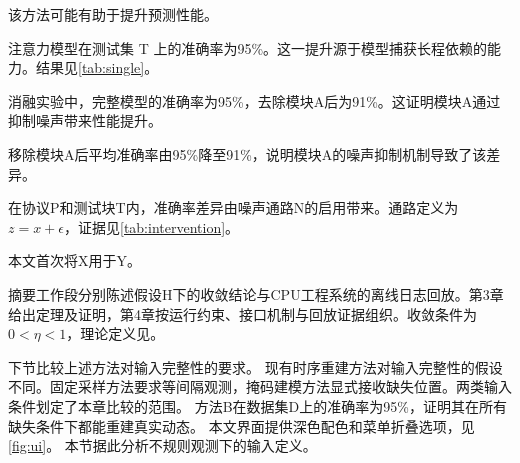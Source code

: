 
该方法可能有助于提升预测性能。

注意力模型在测试集 T 上的准确率为95\%。这一提升源于模型捕获长程依赖的能力。结果见\ref{tab:single}。

消融实验中，完整模型的准确率为95\%，去除模块A后为91\%。这证明模块A通过抑制噪声带来性能提升。

移除模块A后平均准确率由95\%降至91\%，说明模块A的噪声抑制机制导致了该差异。

在协议P和测试块T内，准确率差异由噪声通路N的启用带来。通路定义为$z=x+\epsilon$，证据见\ref{tab:intervention}。

本文首次将X用于Y。

摘要工作段分别陈述假设H下的收敛结论与CPU工程系统的离线日志回放。第3章给出定理及证明，第4章按运行约束、接口机制与回放证据组织。收敛条件为$0<\eta<1$，理论定义见\cite{definition}。

下节比较上述方法对输入完整性的要求。
现有时序重建方法对输入完整性的假设不同。固定采样方法要求等间隔观测，掩码建模方法显式接收缺失位置\cite{regular,masked,survey}。两类输入条件划定了本章比较的范围。
方法B在数据集D上的准确率为95\%，证明其在所有缺失条件下都能重建真实动态。
本文界面提供深色配色和菜单折叠选项，见\ref{fig:ui}。
本节据此分析不规则观测下的输入定义。
